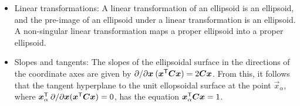 \begin{itemize}
 \item Linear transformations: A linear transformation of an ellipsoid is an ellipsoid, and the pre-image of an ellipsoid under a linear transformation is an ellipsoid.  A non-singular linear transformation maps a proper ellipsoid into a proper ellipsoid.

 \item Slopes and tangents: The slopes of the ellipsoidal surface in the directions of the coordinate
 axes are given by $\partial / \partial \bm{x} \: (\bm{x}^\mathsf{T} \bm{C} \bm{x}) = 2 \bm{C} \bm{x}$.
 From this, it follows that the tangent hyperplane to the unit ellopsoidal surface at the point
 $\vec{x}_\alpha$, where $\bm{x}_\alpha^\mathsf{T} \: \partial / \partial \bm{x} (\bm{x}^\mathsf{T} \bm{C} \bm{x}) = 0$,
 has the equation $\bm{x}_\alpha ^\mathsf{T} \bm{C} \bm{x} = 1$.
\end{itemize}

